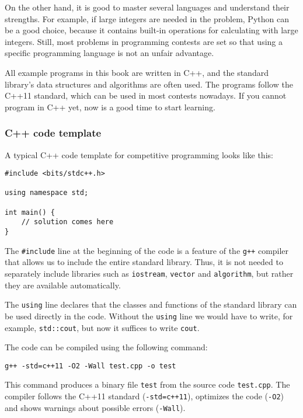 On the other hand, it is good to
master several languages and understand
their strengths.
For example, if large integers are needed
in the problem,
Python can be a good choice, because it
contains built-in operations for
calculating with large integers.
Still, most problems in programming contests
are set so that
using a specific programming language
is not an unfair advantage.

All example programs in this book are written in C++,
and the standard library's
data structures and algorithms are often used.
The programs follow the C++11 standard,
which can be used in most contests nowadays.
If you cannot program in C++ yet,
now is a good time to start learning.

\subsubsection{C++ code template}

A typical C++ code template for competitive programming
looks like this:

\begin{lstlisting}
#include <bits/stdc++.h>

using namespace std;

int main() {
    // solution comes here
}
\end{lstlisting}

The \texttt{\#include} line at the beginning
of the code is a feature of the \texttt{g++} compiler
that allows us to include the entire standard library.
Thus, it is not needed to separately include
libraries such as \texttt{iostream},
\texttt{vector} and \texttt{algorithm},
but rather they are available automatically.

The \texttt{using} line declares
that the classes and functions
of the standard library can be used directly
in the code.
Without the \texttt{using} line we would have
to write, for example, \texttt{std::cout},
but now it suffices to write \texttt{cout}.

The code can be compiled using the following command:

\begin{lstlisting}
g++ -std=c++11 -O2 -Wall test.cpp -o test
\end{lstlisting}

This command produces a binary file \texttt{test}
from the source code \texttt{test.cpp}.
The compiler follows the C++11 standard
(\texttt{-std=c++11}),
optimizes the code (\texttt{-O2})
and shows warnings about possible errors (\texttt{-Wall}).

